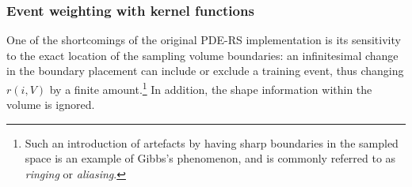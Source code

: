 \subsubsection*{Event weighting with kernel functions}

One of the shortcomings of the original PDE-RS implementation is its 
sensitivity to the exact location of the sampling volume boundaries: an
infinitesimal change in the boundary placement can include or exclude a 
training event, thus changing $r(i,V)$ by a finite amount.\footnote
{
	Such an introduction of artefacts by having sharp boundaries in the 
	sampled space is an example of Gibbs's phenomenon, and is commonly 
   referred to as {\em ringing} or {\em aliasing}. 
} 
In addition, the shape information within the volume is ignored.

